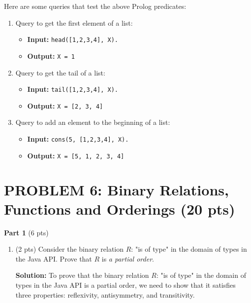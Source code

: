 \documentclass[12pt]{article}
\begin{document}
\begin{spacing}{1.5}
\begin{enumerate}
		      Here are some queries that test the above Prolog predicates:
		      		      
		      \begin{enumerate}
		      	\item Query to get the first element of a list:
		      	      \begin{itemize}
		      	      	\item \textbf{Input:} \texttt{head([1,2,3,4], X).}
		      	      	\item \textbf{Output:} \texttt{X = 1} 
		      	      \end{itemize}
		      	      		      	      
		      	\item Query to get the tail of a list:
		      	      \begin{itemize}
		      	      	\item \textbf{Input:} \texttt{tail([1,2,3,4], X).}
		      	      	\item \textbf{Output:} \texttt{X = [2, 3, 4]} 
		      	      \end{itemize}
		      	      		      	      
		      	\item Query to add an element to the beginning of a list:
		      	      \begin{itemize}
		      	      	\item \textbf{Input:} \texttt{cons(5, [1,2,3,4], X).}
		      	      	\item \textbf{Output:} \texttt{X = [5, 1, 2, 3, 4]} 
		      	      \end{itemize}
		      \end{enumerate}
		      		      		      
	\end{enumerate}
			     
	\newpage
	\section*{PROBLEM 6: Binary Relations, Functions and Orderings (20 pts)}
		
	\textbf{Part 1} (6 pts)
		
	\begin{enumerate}
		\item (2 pts) Consider the binary relation $R$: "is of type" in the domain of types in the Java API. Prove that $R$ is \textit{a partial order}.
		      		      
		      \textbf{Solution:} To prove that the binary relation $R$: "is of type" in the domain of types in the Java API is a partial order, we need to show that it satisfies three properties: reflexivity, antisymmetry, and transitivity.
		      		      

\end{enumerate}
\end{spacing}
\end{document}
